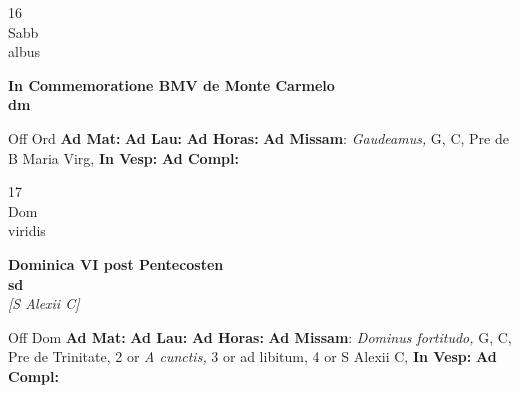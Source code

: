 \documentclass[10pt, openany]{book}
\begin{document}
        \begin{center}
            \begin{minipage}{3.5in}
                \vspace{2em}
                \begin{minipage}{0.5in}
                    {\Huge 16} \\
                    {\normalsize Sabb} \\
                    {\normalsize albus}
                \end{minipage}
                \begin{minipage}{3.0in}
                    \textbf{ \large In Commemoratione BMV de Monte Carmelo \\
                    \textnormal{\normalsize dm}} \\ 
                \end{minipage}
                \begin{justify}Off Ord
                    \textbf{Ad Mat: }
                    \textbf{Ad Lau: }
                    \textbf{Ad Horas: }\textbf{Ad Missam}: \textit{Gaudeamus,} G, C, Pre  de B Maria Virg,  
                    \textbf{In Vesp: }
                    \textbf{Ad Compl: }
                \end{justify}
            \end{minipage}
        \end{center}
    
        \begin{center}
            \begin{minipage}{3.5in}
                \vspace{2em}
                \begin{minipage}{0.5in}
                    {\Huge 17} \\
                    {\normalsize Dom} \\
                    {\normalsize viridis}
                \end{minipage}
                \begin{minipage}{3.0in}
                    \textbf{ \large Dominica VI post Pentecosten \\
                    \textnormal{\normalsize sd}} \\ \textit{[S Alexii C]} \\ 
                \end{minipage}
                \begin{justify}Off Dom
                    \textbf{Ad Mat: }
                    \textbf{Ad Lau: }
                    \textbf{Ad Horas: }\textbf{Ad Missam}: \textit{Dominus fortitudo,} G, C, Pre de Trinitate, 2 or \textit{A cunctis,} 3 or ad libitum, 4 or S Alexii C,  
                    \textbf{In Vesp: }
                    \textbf{Ad Compl: }
                \end{justify}
            \end{minipage}
        \end{center}
    
\end{document}
